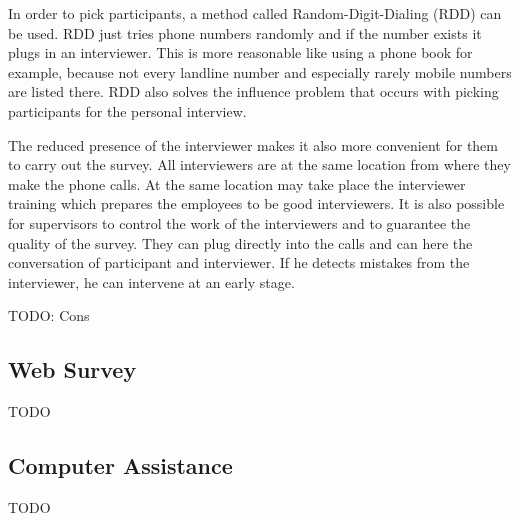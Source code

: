 \documentclass{article}
\begin{document}
In order to pick participants, a method called Random-Digit-Dialing (RDD) can be used. RDD just tries phone numbers randomly and if the number exists it plugs in an interviewer. This is more reasonable like using a phone book for example, because not every landline number and especially rarely mobile numbers are listed there. RDD also solves the influence problem that occurs with picking participants for the personal interview.

The reduced presence of the interviewer makes it also more convenient for them to carry out the survey. All interviewers are at the same location from where they make the phone calls. At the same location may take place the interviewer training which prepares the employees to be good interviewers. It is also possible for supervisors to control the work of the interviewers and to guarantee the quality of the survey. They can plug directly into the calls and can here the conversation of participant and interviewer. If he detects mistakes from the interviewer, he can intervene at an early stage.

TODO: Cons

\subsection{Web Survey}

TODO

\subsection{Computer Assistance}

TODO




{}

\end{document}
